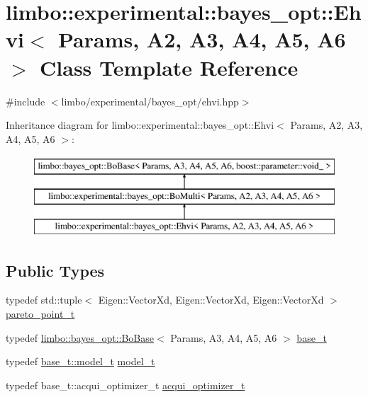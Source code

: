 \hypertarget{classlimbo_1_1experimental_1_1bayes__opt_1_1_ehvi}{}\section{limbo\+:\+:experimental\+:\+:bayes\+\_\+opt\+:\+:Ehvi$<$ Params, A2, A3, A4, A5, A6 $>$ Class Template Reference}
\label{classlimbo_1_1experimental_1_1bayes__opt_1_1_ehvi}


{\ttfamily \#include $<$limbo/experimental/bayes\+\_\+opt/ehvi.\+hpp$>$}

Inheritance diagram for limbo\+:\+:experimental\+:\+:bayes\+\_\+opt\+:\+:Ehvi$<$ Params, A2, A3, A4, A5, A6 $>$\+:\begin{figure}[H]
\begin{center}
\leavevmode
\includegraphics[height=3.000000cm]{classlimbo_1_1experimental_1_1bayes__opt_1_1_ehvi}
\end{center}
\end{figure}
\subsection*{Public Types}
\begin{DoxyCompactItemize}
\item 
typedef std\+::tuple$<$ Eigen\+::\+Vector\+Xd, Eigen\+::\+Vector\+Xd, Eigen\+::\+Vector\+Xd $>$ \hyperlink{classlimbo_1_1experimental_1_1bayes__opt_1_1_ehvi_a98176e0f540cebc76616142da6fbca6e}{pareto\+\_\+point\+\_\+t}
\item 
typedef \hyperlink{classlimbo_1_1bayes__opt_1_1_bo_base}{limbo\+::bayes\+\_\+opt\+::\+Bo\+Base}$<$ Params, A3, A4, A5, A6 $>$ \hyperlink{classlimbo_1_1experimental_1_1bayes__opt_1_1_ehvi_aab1a707afba4fe47658755ca5b66a77e}{base\+\_\+t}
\item 
typedef \hyperlink{classlimbo_1_1bayes__opt_1_1_bo_base_a151af5c7eef92a82d8813bb2e067d267}{base\+\_\+t\+::model\+\_\+t} \hyperlink{classlimbo_1_1experimental_1_1bayes__opt_1_1_ehvi_af9a1e49996eb15f36e08a7398e3b024e}{model\+\_\+t}
\item 
typedef base\+\_\+t\+::acqui\+\_\+optimizer\+\_\+t \hyperlink{classlimbo_1_1experimental_1_1bayes__opt_1_1_ehvi_a0bcaf7560c3d5cb4f18f2b6b3cbd521f}{acqui\+\_\+optimizer\+\_\+t}
\end{DoxyCompactItemize}

